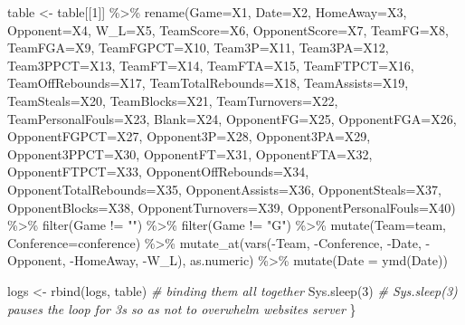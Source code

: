 \documentclass[
]{book}
\newenvironment{Shaded}{\begin{snugshade}}{\end{snugshade}}
\newcommand{\AttributeTok}[1]{\textcolor[rgb]{0.77,0.63,0.00}{#1}}
\newcommand{\CommentTok}[1]{\textcolor[rgb]{0.56,0.35,0.01}{\textit{#1}}}
\newcommand{\DecValTok}[1]{\textcolor[rgb]{0.00,0.00,0.81}{#1}}
\newcommand{\FunctionTok}[1]{\textcolor[rgb]{0.00,0.00,0.00}{#1}}
\newcommand{\NormalTok}[1]{#1}
\newcommand{\OtherTok}[1]{\textcolor[rgb]{0.56,0.35,0.01}{#1}}
\newcommand{\SpecialCharTok}[1]{\textcolor[rgb]{0.00,0.00,0.00}{#1}}
\newcommand{\StringTok}[1]{\textcolor[rgb]{0.31,0.60,0.02}{#1}}
\begin{document}
\begin{Shaded}
\begin{Highlighting}[]
\NormalTok{table }\OtherTok{\textless{}{-}}\NormalTok{ table[[}\DecValTok{1}\NormalTok{]] }\SpecialCharTok{\%\textgreater{}\%} \FunctionTok{rename}\NormalTok{(}\AttributeTok{Game=}\NormalTok{X1, }\AttributeTok{Date=}\NormalTok{X2, }\AttributeTok{HomeAway=}\NormalTok{X3, }\AttributeTok{Opponent=}\NormalTok{X4, }\AttributeTok{W\_L=}\NormalTok{X5, }\AttributeTok{TeamScore=}\NormalTok{X6, }\AttributeTok{OpponentScore=}\NormalTok{X7, }\AttributeTok{TeamFG=}\NormalTok{X8, }\AttributeTok{TeamFGA=}\NormalTok{X9, }\AttributeTok{TeamFGPCT=}\NormalTok{X10, }\AttributeTok{Team3P=}\NormalTok{X11, }\AttributeTok{Team3PA=}\NormalTok{X12, }\AttributeTok{Team3PPCT=}\NormalTok{X13, }\AttributeTok{TeamFT=}\NormalTok{X14, }\AttributeTok{TeamFTA=}\NormalTok{X15, }\AttributeTok{TeamFTPCT=}\NormalTok{X16, }\AttributeTok{TeamOffRebounds=}\NormalTok{X17, }\AttributeTok{TeamTotalRebounds=}\NormalTok{X18, }\AttributeTok{TeamAssists=}\NormalTok{X19, }\AttributeTok{TeamSteals=}\NormalTok{X20, }\AttributeTok{TeamBlocks=}\NormalTok{X21, }\AttributeTok{TeamTurnovers=}\NormalTok{X22, }\AttributeTok{TeamPersonalFouls=}\NormalTok{X23, }\AttributeTok{Blank=}\NormalTok{X24, }\AttributeTok{OpponentFG=}\NormalTok{X25, }\AttributeTok{OpponentFGA=}\NormalTok{X26, }\AttributeTok{OpponentFGPCT=}\NormalTok{X27, }\AttributeTok{Opponent3P=}\NormalTok{X28, }\AttributeTok{Opponent3PA=}\NormalTok{X29, }\AttributeTok{Opponent3PPCT=}\NormalTok{X30, }\AttributeTok{OpponentFT=}\NormalTok{X31, }\AttributeTok{OpponentFTA=}\NormalTok{X32, }\AttributeTok{OpponentFTPCT=}\NormalTok{X33, }\AttributeTok{OpponentOffRebounds=}\NormalTok{X34, }\AttributeTok{OpponentTotalRebounds=}\NormalTok{X35, }\AttributeTok{OpponentAssists=}\NormalTok{X36, }\AttributeTok{OpponentSteals=}\NormalTok{X37, }\AttributeTok{OpponentBlocks=}\NormalTok{X38, }\AttributeTok{OpponentTurnovers=}\NormalTok{X39, }\AttributeTok{OpponentPersonalFouls=}\NormalTok{X40) }\SpecialCharTok{\%\textgreater{}\%} \FunctionTok{filter}\NormalTok{(Game }\SpecialCharTok{!=} \StringTok{""}\NormalTok{) }\SpecialCharTok{\%\textgreater{}\%} \FunctionTok{filter}\NormalTok{(Game }\SpecialCharTok{!=} \StringTok{"G"}\NormalTok{) }\SpecialCharTok{\%\textgreater{}\%} \FunctionTok{mutate}\NormalTok{(}\AttributeTok{Team=}\NormalTok{team, }\AttributeTok{Conference=}\NormalTok{conference) }\SpecialCharTok{\%\textgreater{}\%} \FunctionTok{mutate\_at}\NormalTok{(}\FunctionTok{vars}\NormalTok{(}\SpecialCharTok{{-}}\NormalTok{Team, }\SpecialCharTok{{-}}\NormalTok{Conference, }\SpecialCharTok{{-}}\NormalTok{Date, }\SpecialCharTok{{-}}\NormalTok{Opponent, }\SpecialCharTok{{-}}\NormalTok{HomeAway, }\SpecialCharTok{{-}}\NormalTok{W\_L), as.numeric) }\SpecialCharTok{\%\textgreater{}\%} \FunctionTok{mutate}\NormalTok{(}\AttributeTok{Date =} \FunctionTok{ymd}\NormalTok{(Date))}

\NormalTok{  logs }\OtherTok{\textless{}{-}} \FunctionTok{rbind}\NormalTok{(logs, table)  }\CommentTok{\# binding them all together}
  \FunctionTok{Sys.sleep}\NormalTok{(}\DecValTok{3}\NormalTok{)  }\CommentTok{\# Sys.sleep(3) pauses the loop for 3s so as not to overwhelm website\textquotesingle{}s server}
\NormalTok{\}}
\end{Highlighting}
\end{Shaded}
\end{document}
